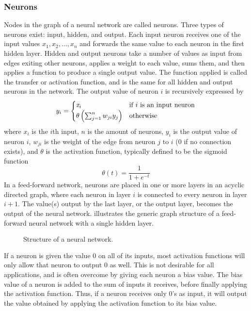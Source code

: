 \subsubsection{Neurons}
Nodes in the graph of a neural network are called neurons. Three types of neurons exist: input, hidden, and output. Each input neuron receives one of the input values $x_1, x_2, \dots, x_n$ and forwards the same value to each neuron in the first hidden layer. Hidden and output neurons take a number of values as input from edges exiting other neurons, applies a weight to each value, sums them, and then applies a function to produce a single output value. The function applied is called the transfer or activation function, and is the same for all hidden and output neurons in the network. The output value of neuron $i$ is recursively expressed by 
\begin{equation*}\label{eq:weightcalc}
  y_i =
  \begin{cases}
    \mathit{x}_i                     & \text{if } i \text{ is an input neuron} \\
    \theta\left(\sum_{j=1}^n w_{ji} y_{j}\right) & \text{otherwise}
  \end{cases}
\end{equation*}
%
where $x_i$ is the $i$th input, $n$ is the amount of neurons, $y_i$ is the output value of neuron $i$, $w_{ji}$ is the weight of the edge from neuron $j$ to $i$ ($0$ if no connection exists), and $\theta$ is the activation function, typically defined to be the sigmoid function
%
\begin{equation*}
  \theta\left(t\right) = \frac{1}{1+e^{-t}}
\end{equation*}
%
In a feed-forward network, neurons are placed in one or more layers in an acyclic directed graph, where each neuron in layer $i$ is connected to every neuron in layer $i + 1$. The value(s) output by the last layer, or the output layer, becomes the output of the neural network.  illustrates the generic graph structure of a feed-forward neural network with a single hidden layer.
%
\begin{figure}[htpb]
  \centering
  \caption{Structure of a neural network.}
  \label{fig:ann}
\end{figure}
%
If a neuron is given the value $0$ on all of its inputs, most activation functions will only allow that neuron to output $0$ as well. This is not desirable for all applications, and is often overcome by giving each neuron a bias value. The bias value of a neuron is added to the sum of inputs it receives, before finally applying the activation function. Thus, if a neuron receives only $0$'s as input, it will output the value obtained by applying the activation function to its bias value.


